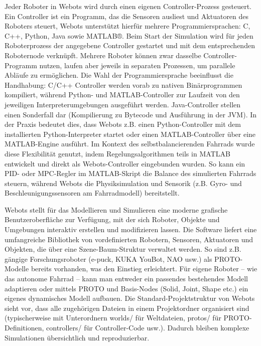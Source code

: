 \documentclass[11pt]{article}
\begin{document}
\vspace{0.2cm}

Jeder Roboter in Webots wird durch einen eigenen Controller-Prozess gesteuert. Ein Controller ist ein Programm, 
das die Sensoren ausliest und Aktuatoren des Roboters steuert, Webots unterstützt hierfür mehrere Programmiersprachen:
C, C++, Python, Java sowie MATLAB®. Beim Start der Simulation wird für jeden Roboterprozess der angegebene Controller
gestartet und mit dem entsprechenden Roboternode verknüpft. Mehrere Roboter können zwar dasselbe Controller-Programm nutzen,
laufen aber jeweils in separaten Prozessen, um parallele Abläufe zu ermöglichen. Die Wahl der Programmiersprache beeinflusst
die Handhabung: C/C++ Controller werden vorab zu nativen Binärprogrammen kompiliert, während Python- und MATLAB-Controller zur 
Laufzeit von den jeweiligen Interpreterumgebungen ausgeführt werden. Java-Controller stellen einen Sonderfall dar 
(Kompilierung zu Bytecode und Ausführung in der JVM). In der Praxis bedeutet dies, dass Webots z.B. einen Python-Controller
mit dem installierten Python-Interpreter startet oder einen MATLAB-Controller über eine MATLAB-Engine ausführt. Im Kontext
des selbstbalancierenden Fahrrads wurde diese Flexibilität genutzt, indem Regelungsalgorithmen teils in MATLAB entwickelt und
direkt als Webots-Controller eingebunden wurden. So kann ein PID- oder MPC-Regler im MATLAB-Skript die Balance des simulierten
Fahrrads steuern, während Webots die Physiksimulation und Sensorik (z.B. Gyro- und Beschleunigungssensoren am Fahrradmodell)
bereitstellt.

Webots stellt für das Modellieren und Simulieren eine moderne grafische Benutzeroberfläche zur Verfügung, mit der sich Roboter,
Objekte und Umgebungen interaktiv erstellen und modifizieren lassen. Die Software liefert eine umfangreiche Bibliothek von 
vordefinierten Robotern, Sensoren, Aktuatoren und Objekten, die über eine Szene-Baum-Struktur verwaltet werden. So sind z.B.
gängige Forschungsroboter (e-puck, KUKA YouBot, NAO usw.) als PROTO-Modelle bereits vorhanden, was den Einstieg erleichtert. 
Für eigene Roboter – wie das autonome Fahrrad – kann man entweder ein passendes bestehendes Modell adaptieren oder mittels PROTO 
und Basis-Nodes (Solid, Joint, Shape etc.) ein eigenes dynamisches Modell aufbauen. Die Standard-Projektstruktur von Webots sieht
vor, dass alle zugehörigen Dateien in einem Projektordner organisiert sind (typischerweise mit Unterordnern worlds/ für Weltdateien,
protos/ für PROTO-Definitionen, controllers/ für Controller-Code usw.). Dadurch bleiben komplexe Simulationen übersichtlich und reproduzierbar.
\end{document}
